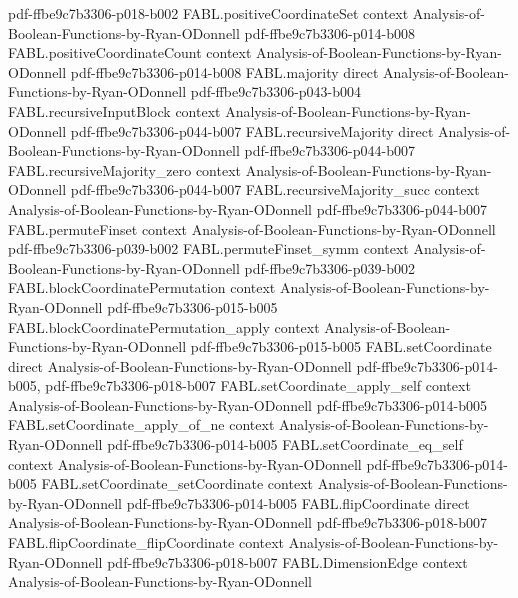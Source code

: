 \begin{theorem}
  {pdf-ffbe9c7b3306-p018-b002}
\proofstep
  {FABL.positiveCoordinateSet}
  {context}
  {Analysis-of-Boolean-Functions-by-Ryan-ODonnell}
  {pdf-ffbe9c7b3306-p014-b008}
\proofstep
  {FABL.positiveCoordinateCount}
  {context}
  {Analysis-of-Boolean-Functions-by-Ryan-ODonnell}
  {pdf-ffbe9c7b3306-p014-b008}
\proofstep
  {FABL.majority}
  {direct}
  {Analysis-of-Boolean-Functions-by-Ryan-ODonnell}
  {pdf-ffbe9c7b3306-p043-b004}
\proofstep
  {FABL.recursiveInputBlock}
  {context}
  {Analysis-of-Boolean-Functions-by-Ryan-ODonnell}
  {pdf-ffbe9c7b3306-p044-b007}
\proofstep
  {FABL.recursiveMajority}
  {direct}
  {Analysis-of-Boolean-Functions-by-Ryan-ODonnell}
  {pdf-ffbe9c7b3306-p044-b007}
\proofstep
  {FABL.recursiveMajority_zero}
  {context}
  {Analysis-of-Boolean-Functions-by-Ryan-ODonnell}
  {pdf-ffbe9c7b3306-p044-b007}
\proofstep
  {FABL.recursiveMajority_succ}
  {context}
  {Analysis-of-Boolean-Functions-by-Ryan-ODonnell}
  {pdf-ffbe9c7b3306-p044-b007}
\proofstep
  {FABL.permuteFinset}
  {context}
  {Analysis-of-Boolean-Functions-by-Ryan-ODonnell}
  {pdf-ffbe9c7b3306-p039-b002}
\proofstep
  {FABL.permuteFinset_symm}
  {context}
  {Analysis-of-Boolean-Functions-by-Ryan-ODonnell}
  {pdf-ffbe9c7b3306-p039-b002}
\proofstep
  {FABL.blockCoordinatePermutation}
  {context}
  {Analysis-of-Boolean-Functions-by-Ryan-ODonnell}
  {pdf-ffbe9c7b3306-p015-b005}
\proofstep
  {FABL.blockCoordinatePermutation_apply}
  {context}
  {Analysis-of-Boolean-Functions-by-Ryan-ODonnell}
  {pdf-ffbe9c7b3306-p015-b005}
\proofstep
  {FABL.setCoordinate}
  {direct}
  {Analysis-of-Boolean-Functions-by-Ryan-ODonnell}
  {pdf-ffbe9c7b3306-p014-b005,
    pdf-ffbe9c7b3306-p018-b007}
\proofstep
  {FABL.setCoordinate_apply_self}
  {context}
  {Analysis-of-Boolean-Functions-by-Ryan-ODonnell}
  {pdf-ffbe9c7b3306-p014-b005}
\proofstep
  {FABL.setCoordinate_apply_of_ne}
  {context}
  {Analysis-of-Boolean-Functions-by-Ryan-ODonnell}
  {pdf-ffbe9c7b3306-p014-b005}
\proofstep
  {FABL.setCoordinate_eq_self}
  {context}
  {Analysis-of-Boolean-Functions-by-Ryan-ODonnell}
  {pdf-ffbe9c7b3306-p014-b005}
\proofstep
  {FABL.setCoordinate_setCoordinate}
  {context}
  {Analysis-of-Boolean-Functions-by-Ryan-ODonnell}
  {pdf-ffbe9c7b3306-p014-b005}
\proofstep
  {FABL.flipCoordinate}
  {direct}
  {Analysis-of-Boolean-Functions-by-Ryan-ODonnell}
  {pdf-ffbe9c7b3306-p018-b007}
\proofstep
  {FABL.flipCoordinate_flipCoordinate}
  {context}
  {Analysis-of-Boolean-Functions-by-Ryan-ODonnell}
  {pdf-ffbe9c7b3306-p018-b007}
\proofstep
  {FABL.DimensionEdge}
  {context}
  {Analysis-of-Boolean-Functions-by-Ryan-ODonnell}

\end{theorem}

